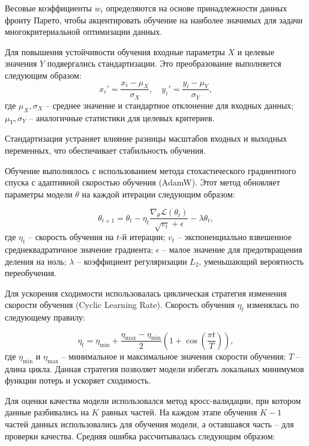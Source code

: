Весовые коэффициенты $w_i$ определяются на основе принадлежности
данных фронту Парето, чтобы акцентировать обучение на наиболее значимых
для задачи многокритериальной оптимизации данных.

Для повышения устойчивости обучения входные параметры $X$ и целевые
значения $Y$ подвергались стандартизации. Это преобразование выполняется следующим образом:
\begin{equation}
x_i' = \frac{x_i - \mu_X}{\sigma_X}, \quad y_i' = \frac{y_i - \mu_Y}{\sigma_Y},
\end{equation}
где $\mu_X, \sigma_X$ -- среднее значение и стандартное отклонение для входных данных;
$\mu_Y, \sigma_Y$ -- аналогичные статистики для целевых критериев. 

Стандартизация устраняет влияние разницы масштабов входных и выходных переменных, что обеспечивает стабильность обучения.

Обучение выполнялось с использованием метода стохастического градиентного спуска
с адаптивной скоростью обучения (AdamW). Этот метод обновляет параметры модели $\theta$ на каждой итерации следующим образом:

\begin{equation}
\theta_{t+1} = \theta_t - \eta_t \frac{\nabla_\theta \mathcal{L}(\theta_t)}{\sqrt{v_t} + \epsilon} - \lambda \theta_t,
\end{equation}
где $\eta_t$ -- скорость обучения на $t$-й итерации;
$v_t$ -- экспоненциально взвешенное среднеквадратичное значение градиента;
$\epsilon$ -- малое значение для предотвращения деления на ноль;
$\lambda$ -- коэффициент регуляризации $L_2$, уменьшающий вероятность переобучения.

Для ускорения сходимости использовалась циклическая стратегия изменения
скорости обучения (Cyclic Learning Rate). Скорость обучения $\eta_t$ изменялась по следующему правилу:

\begin{equation}
\eta_t = \eta_{\min} + \frac{\eta_{\max} - \eta_{\min}}{2} \left(1 + \cos\left(\frac{\pi t}{T}\right)\right),
\end{equation}
где $\eta_{\min}$ и $\eta_{\max}$ -- минимальное и максимальное значения скорости обучения;
$T$ -- длина цикла. Данная стратегия позволяет модели избегать локальных минимумов функции потерь и ускоряет сходимость.

Для оценки качества модели использовался метод кросс-валидации,
при котором данные разбивались на $K$ равных частей. На каждом этапе
обучения $K-1$ частей данных использовались для обучения модели,
а оставшаяся часть -- для проверки качества. Средняя ошибка рассчитывалась следующим образом:

